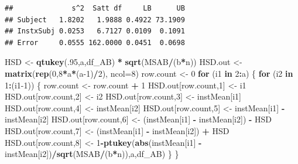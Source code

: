 \documentclass[
]{book}
\newenvironment{Shaded}{\begin{snugshade}}{\end{snugshade}}
\newcommand{\AttributeTok}[1]{\textcolor[rgb]{0.13,0.29,0.53}{#1}}
\newcommand{\ControlFlowTok}[1]{\textcolor[rgb]{0.13,0.29,0.53}{\textbf{#1}}}
\newcommand{\DecValTok}[1]{\textcolor[rgb]{0.00,0.00,0.81}{#1}}
\newcommand{\FunctionTok}[1]{\textcolor[rgb]{0.13,0.29,0.53}{\textbf{#1}}}
\newcommand{\NormalTok}[1]{#1}
\newcommand{\OtherTok}[1]{\textcolor[rgb]{0.56,0.35,0.01}{#1}}
\newcommand{\SpecialCharTok}[1]{\textcolor[rgb]{0.81,0.36,0.00}{\textbf{#1}}}
\begin{document}
\begin{verbatim}
##              s^2  Satt df     LB      UB
## Subject   1.8202   1.9888 0.4922 73.1909
## InstxSubj 0.0253   6.7127 0.0109  0.1091
## Error     0.0555 162.0000 0.0451  0.0698
\end{verbatim}

\begin{Shaded}
\begin{Highlighting}[]
\NormalTok{HSD }\OtherTok{\textless{}{-}} \FunctionTok{qtukey}\NormalTok{(.}\DecValTok{95}\NormalTok{,a,df\_AB) }\SpecialCharTok{*} \FunctionTok{sqrt}\NormalTok{(MSAB}\SpecialCharTok{/}\NormalTok{(b}\SpecialCharTok{*}\NormalTok{n))}
\NormalTok{HSD.out }\OtherTok{\textless{}{-}} \FunctionTok{matrix}\NormalTok{(}\FunctionTok{rep}\NormalTok{(}\DecValTok{0}\NormalTok{,}\DecValTok{8}\SpecialCharTok{*}\NormalTok{a}\SpecialCharTok{*}\NormalTok{(a}\DecValTok{{-}1}\NormalTok{)}\SpecialCharTok{/}\DecValTok{2}\NormalTok{), }\AttributeTok{ncol=}\DecValTok{8}\NormalTok{)}
\NormalTok{row.count }\OtherTok{\textless{}{-}} \DecValTok{0}
\ControlFlowTok{for}\NormalTok{ (i1 }\ControlFlowTok{in} \DecValTok{2}\SpecialCharTok{:}\NormalTok{a) \{}
  \ControlFlowTok{for}\NormalTok{ (i2 }\ControlFlowTok{in} \DecValTok{1}\SpecialCharTok{:}\NormalTok{(i1}\DecValTok{{-}1}\NormalTok{)) \{}
\NormalTok{    row.count }\OtherTok{\textless{}{-}}\NormalTok{ row.count }\SpecialCharTok{+} \DecValTok{1}
\NormalTok{    HSD.out[row.count,}\DecValTok{1}\NormalTok{] }\OtherTok{\textless{}{-}}\NormalTok{ i1}
\NormalTok{    HSD.out[row.count,}\DecValTok{2}\NormalTok{] }\OtherTok{\textless{}{-}}\NormalTok{ i2}
\NormalTok{    HSD.out[row.count,}\DecValTok{3}\NormalTok{] }\OtherTok{\textless{}{-}}\NormalTok{ instMean[i1]}
\NormalTok{    HSD.out[row.count,}\DecValTok{4}\NormalTok{] }\OtherTok{\textless{}{-}}\NormalTok{ instMean[i2]}
\NormalTok{    HSD.out[row.count,}\DecValTok{5}\NormalTok{] }\OtherTok{\textless{}{-}}\NormalTok{ instMean[i1] }\SpecialCharTok{{-}}\NormalTok{ instMean[i2]}
\NormalTok{    HSD.out[row.count,}\DecValTok{6}\NormalTok{] }\OtherTok{\textless{}{-}}\NormalTok{ (instMean[i1] }\SpecialCharTok{{-}}\NormalTok{ instMean[i2]) }\SpecialCharTok{{-}}\NormalTok{ HSD}
\NormalTok{    HSD.out[row.count,}\DecValTok{7}\NormalTok{] }\OtherTok{\textless{}{-}}\NormalTok{ (instMean[i1] }\SpecialCharTok{{-}}\NormalTok{ instMean[i2]) }\SpecialCharTok{+}\NormalTok{ HSD}
\NormalTok{    HSD.out[row.count,}\DecValTok{8}\NormalTok{] }\OtherTok{\textless{}{-}} 
      \DecValTok{1}\SpecialCharTok{{-}}\FunctionTok{ptukey}\NormalTok{(}\FunctionTok{abs}\NormalTok{(instMean[i1] }\SpecialCharTok{{-}}\NormalTok{ instMean[i2])}\SpecialCharTok{/}\FunctionTok{sqrt}\NormalTok{(MSAB}\SpecialCharTok{/}\NormalTok{(b}\SpecialCharTok{*}\NormalTok{n)),a,df\_AB)}
\NormalTok{  \}}
\NormalTok{\}}


\end{Highlighting}
\end{Shaded}
\end{document}
